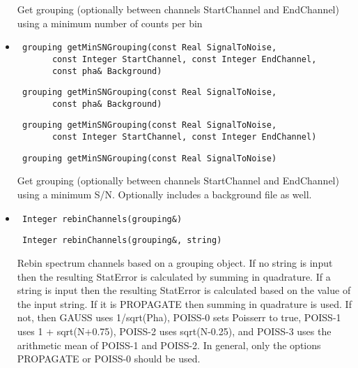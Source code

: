 \documentclass[11pt]{book}
\begin{document}
\begin{itemize}
           Get grouping (optionally between channels StartChannel and 
           EndChannel) using a minimum number of counts per bin

\item  \begin{verbatim} grouping getMinSNGrouping(const Real SignalToNoise, 
       const Integer StartChannel, const Integer EndChannel, 
       const pha& Background) \end{verbatim}
       \begin{verbatim} grouping getMinSNGrouping(const Real SignalToNoise, 
       const pha& Background) \end{verbatim}
       \begin{verbatim} grouping getMinSNGrouping(const Real SignalToNoise, 
       const Integer StartChannel, const Integer EndChannel) \end{verbatim}
       \begin{verbatim} grouping getMinSNGrouping(const Real SignalToNoise) \end{verbatim}

           Get grouping (optionally between channels StartChannel and 
           EndChannel) using a minimum S/N. Optionally includes a 
           background file as well.

\item  \begin{verbatim} Integer rebinChannels(grouping&) \end{verbatim}
       \begin{verbatim} Integer rebinChannels(grouping&, string) \end{verbatim}

           Rebin spectrum channels based on a grouping object. If no
           string is input then the resulting StatError is calculated
           by summing in quadrature. If a string is input then the
           resulting StatError is calculated based on the value of the
           input string. If it is PROPAGATE then summing in quadrature
           is used. If not, then GAUSS uses 1/sqrt(Pha), POISS-0 sets
           Poisserr to true, POISS-1 uses 1 + sqrt(N+0.75), POISS-2
           uses sqrt(N-0.25), and POISS-3 uses the arithmetic mean of
           POISS-1 and POISS-2. In general, only the options PROPAGATE
           or POISS-0 should be used.


\end{itemize}
\end{document}
